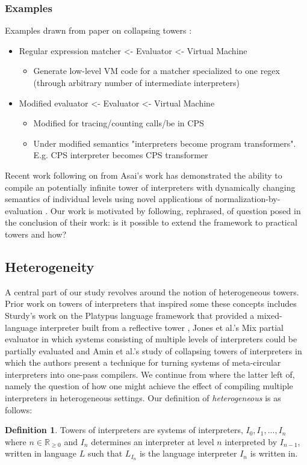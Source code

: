 \documentclass{article}
\theoremstyle{definition}
\newtheorem{definition}{Definition}[section]
\begin{document}
\subsubsection{Examples}
Examples drawn from paper on collapsing towers \cite{amin2017collapsing}:
\begin{itemize}
	\item Regular expression matcher <- Evaluator <- Virtual Machine
	\begin{itemize}
		\item Generate low-level VM code for a matcher specialized to one regex (through arbitrary number of intermediate interpreters)
	\end{itemize}
	\item Modified evaluator <- Evaluator <- Virtual Machine
	\begin{itemize}
		\item Modified for tracing/counting calls/be in CPS
		\item Under modified semantics "interpreters become program transformers". E.g. CPS interpreter becomes CPS transformer
	\end{itemize}
\end{itemize}

Recent work following on from Asai's work has demonstrated the ability to compile an potentially infinite tower of interpreters with dynamically changing semantics of individual levels using novel applications of normalization-by-evaluation \cite{amin2017collapsing}. Our work is motivated by following, rephrased, of question posed in the conclusion of their work: is it possible to extend the framework to practical towers and how?

\subsection{Heterogeneity}
A central part of our study revolves around the notion of heterogeneous towers. Prior work on towers of interpreters that inspired some these concepts includes Sturdy's work on the Platypus language framework that provided a mixed-language interpreter built from a reflective tower \cite{sturdy1993lisp}, Jones et al.'s Mix partial evaluator \cite{jones1989mix} in which systems consisting of multiple levels of interpreters could be partially evaluated and Amin et al.'s study of collapsing towers of interpreters in which the authors present a technique for turning systems of meta-circular interpreters into one-pass compilers. We continue from where the latter left of, namely the question of how one might achieve the effect of compiling multiple interpreters in heterogeneous settings. Our definition of \textit{heterogeneous} is as follows:
\theoremstyle{definition}
\begin{definition}
	Towers of interpreters are systems of interpreters, $I_0, I_1, ..., I_n$ where $n \in \mathbb R_{\ge 0}$ and $I_n$ determines an interpreter at level $n$ interpreted by $I_{n-1}$, written in language $L$ such that $L_{I_n}$ is the language interpreter $I_n$ is written in.
\end{definition}
\end{document}
